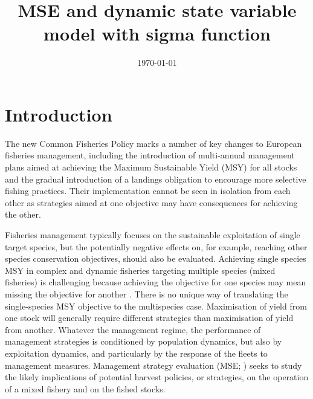 \documentclass[12pt,oneline,a4paper,numbib]{ouparticle}
\begin{document}
\title{MSE and dynamic state variable model with sigma function}

\author{%
\address{European Commission, Joint Research Centre (JRC), Sustainable Resources Directorate, Water and Marine Resources Unit, Via Enrico Fermi 2749, 21027 Ispra, Italy.}
\and
{}
\address{Wageningen Marine Research, PO Box 68, 1970 AB IJmuiden, The Netherlands.}
}


\date{\today}


\maketitle


\section{Introduction}
\label{sec1}

The new Common Fisheries Policy marks a number of key changes to European fisheries management, including the introduction of multi-annual management plans aimed at achieving the Maximum Sustainable Yield (MSY) for all stocks and the gradual introduction of a landings obligation to encourage more selective fishing practices. Their implementation cannot be seen in isolation from each other as strategies aimed at one objective may have consequences for achieving the other.

Fisheries management typically focuses on the sustainable exploitation of single target species, but the potentially negative effects on, for example, reaching other species conservation objectives, should also be evaluated. Achieving single species MSY in complex and dynamic fisheries targeting multiple species (mixed fisheries) is challenging because achieving the objective for one species may mean missing the objective for another \cite{Ulrich2017}. There is no unique way of translating the single-species MSY objective to the multispecies case. Maximisation of yield from one stock will generally require different strategies than maximisation of yield from another.  Whatever the management regime, the performance of management strategies is conditioned by population dynamics, but also by exploitation dynamics, and particularly by the response of the fleets to management measures. Management strategy evaluation (MSE; \cite{Sainsbury2000, Smith1994, Venables2009}) seeks to study the likely implications of potential harvest policies, or strategies, on the operation of a mixed fishery and on the fished stocks. 
\end{document}
